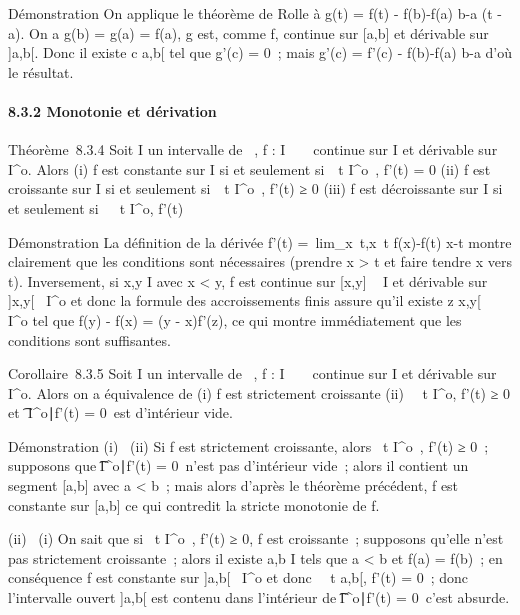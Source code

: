 \documentclass[]{article}
\begin{document}
Démonstration On applique le théorème de Rolle à g(t) = f(t) -
f(b)-f(a) \over b-a (t - a). On a g(b) = g(a) = f(a), g
est, comme f, continue sur {[}a,b{]} et dérivable sur {]}a,b{[}. Donc il
existe c \in{]}a,b{[} tel que g'(c) = 0~; mais g'(c) = f'(c) - f(b)-f(a)
\over b-a d'où le résultat.

\paragraph{8.3.2 Monotonie et dérivation}

Théorème~8.3.4 Soit I un intervalle de ~, f : I \rightarrow~ ~ continue sur I et
dérivable sur I^o. Alors (i) f est constante sur I si et
seulement si~\forall~t \in I^o~, f'(t) = 0
(ii) f est croissante sur I si et seulement
si~\forall~t \in I^o~, f'(t) ≥ 0 (iii) f est
décroissante sur I si et seulement si~\forall~~t \in
I^o, f'(t) 

Démonstration La définition de la dérivée f'(t)
=\
lim_x\rightarrow~t,x\neq~t f(x)-f(t)
\over x-t montre clairement que les conditions sont
nécessaires (prendre x \textgreater{} t et faire tendre x vers t).
Inversement, si x,y \in I avec x \textless{} y, f est continue sur
{[}x,y{]} \subset~ I et dérivable sur {]}x,y{[}\subset~ I^o et donc la
formule des accroissements finis assure qu'il existe z \in{]}x,y{[}\subset~
I^o tel que f(y) - f(x) = (y - x)f'(z), ce qui montre
immédiatement que les conditions sont suffisantes.

Corollaire~8.3.5 Soit I un intervalle de ~, f : I \rightarrow~ ~ continue sur I et
dérivable sur I^o. Alors on a équivalence de (i) f est
strictement croissante (ii) \forall~~t \in
I^o, f'(t) ≥ 0 et \t \in
I^o∣f'(t) = 0\
est d'intérieur vide.

Démonstration (i) \rigtharrow~(ii) Si f est strictement croissante, alors
\forall~t \in I^o~, f'(t) ≥ 0~; supposons que
\t \in I^o∣f'(t) =
0\ n'est pas d'intérieur vide~; alors il contient un
segment {[}a,b{]} avec a \textless{} b~; mais alors d'après le théorème
précédent, f est constante sur {[}a,b{]} ce qui contredit la stricte
monotonie de f.

(ii) \rigtharrow~(i) On sait que si \forall~t \in I^o~,
f'(t) ≥ 0, f est croissante~; supposons qu'elle n'est pas strictement
croissante~; alors il existe a,b \in I tels que a \textless{} b et f(a) =
f(b)~; en conséquence f est constante sur {]}a,b{[}\subset~ I^o et
donc \forall~~t \in{]}a,b{[}, f'(t) = 0~; donc
l'intervalle ouvert {]}a,b{[} est contenu dans l'intérieur de
\t \in I^o∣f'(t) =
0\, c'est absurde.
\end{document}
